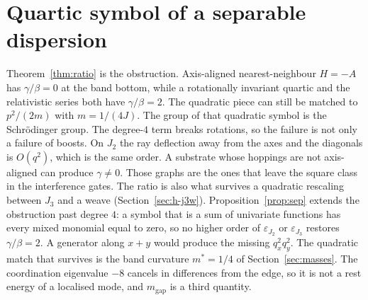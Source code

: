\section{Quartic symbol of a separable dispersion}
\label{sec:h-lorentz}

Theorem~\ref{thm:ratio} is the obstruction.
Axis-aligned nearest-neighbour \(H=-A\) has \(\gamma/\beta=0\) at the band
bottom, while a rotationally invariant quartic and the relativistic series
both have \(\gamma/\beta=2\).
The quadratic piece can still be matched to \(p^2/(2m)\) with \(m=1/(4J)\).
The group of that quadratic symbol is the Schr\"odinger group.
The degree-\(4\) term breaks rotations, so the failure is not only a failure
of boosts.
On \(J_2\) the ray deflection away from the axes and the diagonals is
\(O(q^2)\), which is the same order.
A substrate whose hoppings are not axis-aligned can produce \(\gamma\neq 0\).
Those graphs are the ones that leave the square class in the interference gates.
The ratio is also what survives a quadratic rescaling between \(J_3\) and a
weave (Section~\ref{sec:h-j3w}).
Proposition~\ref{prop:sep} extends the obstruction past degree \(4\):
a symbol that is a sum of univariate functions has every mixed monomial
equal to zero, so no higher order of \(\varepsilon_{J_2}\) or
\(\varepsilon_{J_3}\) restores \(\gamma/\beta=2\).
A generator along \(x+y\) would produce the missing \(q_x^2 q_y^2\).
The quadratic match that survives is the band curvature \(m^*=1/4\) of
Section~\ref{sec:masses}.
The coordination eigenvalue \(-8\) cancels in differences from the edge,
so it is not a rest energy of a localised mode, and \(m_{\mathrm{gap}}\)
is a third quantity.
